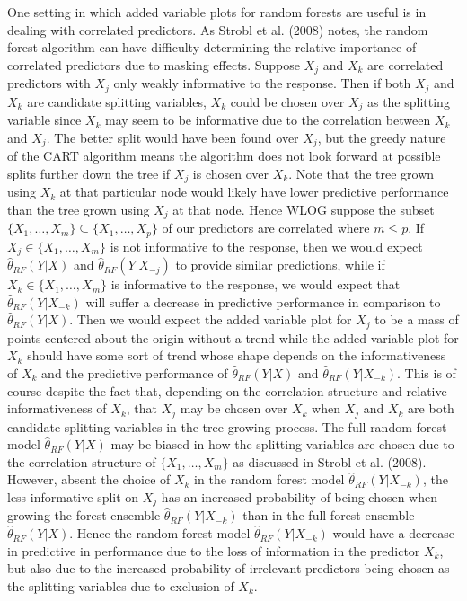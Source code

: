 \documentclass[12pt,twoside]{reedthesis}
\theoremstyle{definition}
\theoremstyle{definition}
\theoremstyle{definition}
\theoremstyle{remark}
\begin{document}
One setting in which added variable plots for random forests are useful
is in dealing with correlated predictors. As Strobl et al. (2008) notes,
the random forest algorithm can have difficulty determining the relative
importance of correlated predictors due to masking effects. Suppose
\(X_j\) and \(X_k\) are correlated predictors with \(X_j\) only weakly
informative to the response. Then if both \(X_j\) and \(X_k\) are
candidate splitting variables, \(X_k\) could be chosen over \(X_j\) as
the splitting variable since \(X_k\) may seem to be informative due to
the correlation between \(X_k\) and \(X_j\). The better split would have
been found over \(X_j\), but the greedy nature of the CART algorithm
means the algorithm does not look forward at possible splits further
down the tree if \(X_j\) is chosen over \(X_k\). Note that the tree
grown using \(X_k\) at that particular node would likely have lower
predictive performance than the tree grown using \(X_j\) at that node.
Hence WLOG suppose the subset
\(\{X_1,\ldots,X_m\}\subseteq \{X_1,\ldots,X_p\}\) of our predictors are
correlated where \(m\leq p\). If \(X_j\in \{X_1,\ldots,X_m\}\) is not
informative to the response, then we would expect
\(\hat{\theta}_{RF}(Y|X)\) and \(\hat{\theta}_{RF}(Y|X_{-j})\) to
provide similar predictions, while if \(X_k\in \{X_1,\ldots,X_m\}\) is
informative to the response, we would expect that
\(\hat{\theta}_{RF}(Y|X_{-k})\) will suffer a decrease in predictive
performance in comparison to \(\hat{\theta}_{RF}(Y|X)\). Then we would
expect the added variable plot for \(X_j\) to be a mass of points
centered about the origin without a trend while the added variable plot
for \(X_k\) should have some sort of trend whose shape depends on the
informativeness of \(X_k\) and the predictive performance of
\(\hat{\theta}_{RF}(Y|X)\) and \(\hat{\theta}_{RF}(Y|X_{-k})\). This is
of course despite the fact that, depending on the correlation structure
and relative informativeness of \(X_k\), that \(X_j\) may be chosen over
\(X_k\) when \(X_j\) and \(X_k\) are both candidate splitting variables
in the tree growing process. The full random forest model
\(\hat{\theta}_{RF}(Y|X)\) may be biased in how the splitting variables
are chosen due to the correlation structure of \(\{X_1,\ldots,X_m\}\) as
discussed in Strobl et al. (2008). However, absent the choice of \(X_k\)
in the random forest model \(\hat{\theta}_{RF}(Y|X_{-k})\), the less
informative split on \(X_j\) has an increased probability of being
chosen when growing the forest ensemble \(\hat{\theta}_{RF}(Y|X_{-k})\)
than in the full forest ensemble \(\hat{\theta}_{RF}(Y|X)\). Hence the
random forest model \(\hat{\theta}_{RF}(Y|X_{-k})\) would have a
decrease in predictive in performance due to the loss of information in
the predictor \(X_k\), but also due to the increased probability of
irrelevant predictors being chosen as the splitting variables due to
exclusion of \(X_k\).
\end{document}
